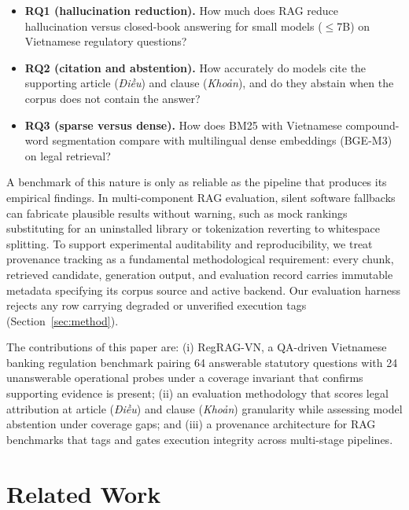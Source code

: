 \documentclass[conference,a4paper]{IEEEtran}
\begin{document}
\begin{itemize}
\item \textbf{RQ1 (hallucination reduction).} How much does RAG reduce hallucination versus closed-book answering for small models ($\leq$7B) on Vietnamese regulatory questions?
\item \textbf{RQ2 (citation and abstention).} How accurately do models cite the supporting article (\emph{Điều}) and clause (\emph{Khoản}), and do they abstain when the corpus does not contain the answer?
\item \textbf{RQ3 (sparse versus dense).} How does BM25 with Vietnamese compound-word segmentation compare with multilingual dense embeddings (BGE-M3) on legal retrieval?
\end{itemize}

A benchmark of this nature is only as reliable as the pipeline that produces its empirical findings. In multi-component RAG evaluation, silent software fallbacks can fabricate plausible results without warning, such as mock rankings substituting for an uninstalled library or tokenization reverting to whitespace splitting. To support experimental auditability and reproducibility, we treat provenance tracking as a fundamental methodological requirement: every chunk, retrieved candidate, generation output, and evaluation record carries immutable metadata specifying its corpus source and active backend. Our evaluation harness rejects any row carrying degraded or unverified execution tags (Section~\ref{sec:method}).

The contributions of this paper are: (i) RegRAG-VN, a QA-driven Vietnamese banking regulation benchmark pairing 64 answerable statutory questions with 24 unanswerable operational probes under a coverage invariant that confirms supporting evidence is present; (ii) an evaluation methodology that scores legal attribution at article (\emph{Điều}) and clause (\emph{Khoản}) granularity while assessing model abstention under coverage gaps; and (iii) a provenance architecture for RAG benchmarks that tags and gates execution integrity across multi-stage pipelines.

\section{Related Work}
\label{sec:related}
\end{document}
